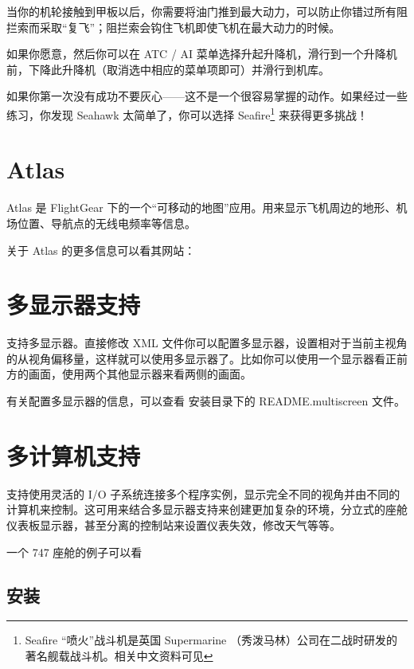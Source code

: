 当你的机轮接触到甲板以后，你需要将油门推到最大动力，可以防止你错过所有阻拦索而采取“复飞”；阻拦索会钩住飞机即使飞机在最大动力的时候。

如果你愿意，然后你可以在 ATC / AI 菜单选择升起升降机，滑行到一个升降机前，下降此升降机（取消选中相应的菜单项即可）并滑行到机库。

如果你第一次没有成功不要灰心——这不是一个很容易掌握的动作。如果经过一些练习，你发现 Seahawk 太简单了，你可以选择 Seafire\footnote{Seafire “喷火”战斗机是英国 Supermarine （秀泼马林）公司在二战时研发的著名舰载战斗机。相关中文资料可见} 来获得更多挑战！

\section{Atlas\label{Atlas}}

Atlas 是 FlightGear 下的一个“可移动的地图”应用。用来显示飞机周边的地形、机场位置、导航点的无线电频率等信息。

关于 Atlas 的更多信息可以看其网站：

\noindent
{}

\section{多显示器支持}

\FlightGear{} 支持多显示器。直接修改 XML 文件你可以配置多显示器，设置相对于当前主视角的从视角偏移量，这样就可以使用多显示器了。比如你可以使用一个显示器看正前方的画面，使用两个其他显示器来看两侧的画面。

有关配置多显示器的信息，可以查看 \FlightGear{} 安装目录下的 README.multiscreen 文件。

\section{多计算机支持}

\FlightGear{} 支持使用灵活的 I/O 子系统连接多个程序实例，显示完全不同的视角并由不同的计算机来控制。这可用来结合多显示器支持来创建更加复杂的环境，分立式的座舱仪表板显示器，甚至分离的控制站来设置仪表失效，修改天气等等。

一个 747 座舱的例子可以看

\noindent
{}

\subsection{安装}

